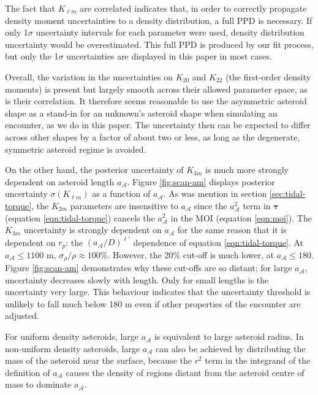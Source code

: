 \documentclass[fleqn,usenatbib]{mnras}
\begin{document}
The fact that $K_{\ell m}$ are correlated indicates that, in order to correctly propagate density moment uncertainties to a density distribution, a full PPD is necessary. If only 1$\sigma$ uncertainty intervals for each parameter were used, density distribution uncertainty would be overestimated. This full PPD is produced by our fit process, but only the 1$\sigma$ uncertainties are displayed in this paper in most cases.

Overall, the variation in the uncertainties on $K_{20}$ and $K_{22}$ (the first-order density moments) is present but largely smooth across their allowed parameter space, as is their correlation. It therefore seems reasonable to use the asymmetric asteroid shape as a stand-in for an unknown's asteroid shape when simulating an encounter, as we do in this paper. The uncertainty then can be expected to differ across other shapes by a factor of about two or less, as long as the degenerate, symmetric asteroid regime is avoided.

On the other hand, the posterior uncertainty of $K_{3m}$ is much more strongly dependent on asteroid length $a_\mathcal{A}$. Figure \ref{fig:scan-am} displays posterior uncertainty $\sigma(K_{\ell m})$ as a function of $a_\mathcal{A}$. As was mention in section \ref{sec:tidal-torque}, the $K_{2m}$ parameters are insensitive to $a_\mathcal{A}$ since the $a_\mathcal{A}^2$ term in $\bm \tau$ (equation \ref{eqn:tidal-torque}) cancels the $a_\mathcal{A}^2$ in the MOI (equation \ref{eqn:moi}). The $K_{3m}$ uncertainty is strongly dependent on $a_\mathcal{A}$ for the same reason that it is dependent on $r_p$: the $(a_\mathcal{A}/D)^{\ell'}$ dependence of equation \ref{eqn:tidal-torque}. At $a_\mathcal{A} \leq 1100$ m, $\sigma_\rho/\rho \approx 100\%$. However, the 20\% cut-off is much lower, at $a_\mathcal{A} \leq 180$. Figure \ref{fig:scan-am} demonstrates why these cut-offs are so distant; for large $a_\mathcal{A}$, uncertainty decreases slowly with length. Only for small lengths is the uncertainty very large. This behaviour indicates that the uncertainty threshold is unlikely to fall much below 180 m even if other properties of the encounter are adjusted.

For uniform density asteroids, large $a_\mathcal{A}$ is equivalent to large asteroid radius. In non-uniform density asteroids, large $a_\mathcal{A}$ can also be achieved by distributing the mass of the asteroid near the surface, because the $r^2$ term in the integrand of the definition of $a_\mathcal{A}$ causes the density of regions distant from the asteroid centre of mass to dominate $a_\mathcal{A}$.
\end{document}
